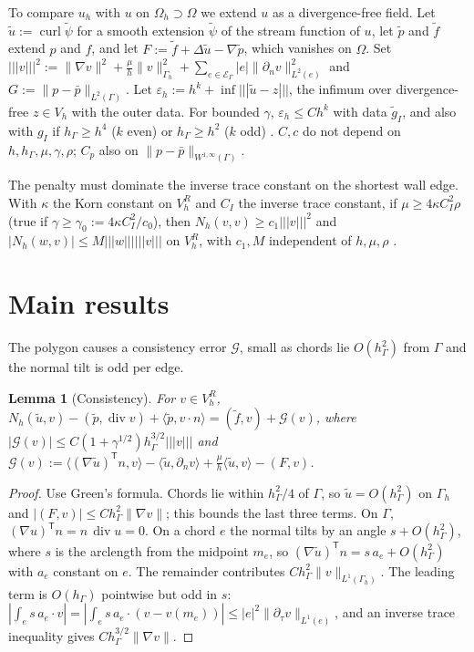 \documentclass[5p,times]{elsarticle}
\newtheorem{lemma}{Lemma}
\theoremstyle{definition}
\newcommand{\hG}{h_\Gamma}
\newcommand{\Gh}{\Gamma_h}
\newcommand{\Oh}{\Omega_h}
\newcommand{\EG}{\mathcal E_\Gamma}
\newcommand{\Vh}{V_h}
\newcommand{\VR}{V_h^R}
\newcommand{\gI}{g_I}
\newcommand{\dn}{\partial_n}
\newcommand{\ut}{\tilde u}
\newcommand{\pt}{\tilde p}
\newcommand{\ft}{\tilde f}
\newcommand{\pbar}{\bar p}
\newcommand{\ip}[2]{\langle #1,#2\rangle}
\newcommand{\tnorm}[1]{|\!|\!|#1|\!|\!|}
\newcommand{\norm}[1]{\lVert #1\rVert}
\newcommand{\eps}{\varepsilon_h}
\newcommand{\Gc}{\mathcal G}
\newcommand{\curl}{\operatorname{curl}}
\renewcommand{\div}{\operatorname{div}}
\newcommand{\ext}[1]{\cite[#1]{PadhiExt}}
\begin{document}
To compare $u_h$ with $u$ on $\Oh\supset\Omega$ we extend $u$ as a divergence-free field. Let $\ut:=\curl\tilde\psi$ for a smooth extension $\tilde\psi$ of the stream function of $u$, let $\pt$ and $\ft$ extend $p$ and $f$, and let $F:=\ft+\Delta\ut-\nabla\pt$, which vanishes on $\Omega$. Set
$\tnorm v^2:=\norm{\nabla v}^2+\frac\mu h\norm v^2_{\Gh}+\sum_{e\in\EG}|e|\norm{\dn v}^2_{L^2(e)}$ and $G:=\norm{p-\pbar}_{L^2(\Gamma)}$.
Let $\eps:=h^k+\inf\tnorm{\ut-z}$, the infimum over divergence-free $z\in\Vh$ with the outer data. For bounded $\gamma$, $\eps\le Ch^k$ with data $\tilde g_I$, and also with $\gI$ if $\hG\ge h^4$ ($k$ even) or $\hG\ge h^2$ ($k$ odd) \ext{Lemmas~4.6, 7.32}. $C,c$ do not depend on $h,\hG,\mu,\gamma,\rho$; $C_p$ also on $\norm{p-\pbar}_{W^{1,\infty}(\Gamma)}$.

The penalty must dominate the inverse trace constant on the shortest wall edge. With $\kappa$ the Korn constant on $\VR$ and $C_I$ the inverse trace constant, if $\mu\ge4\kappa C_I^2\rho$ (true if $\gamma\ge\gamma_0:=4\kappa C_I^2/c_0$), then $N_h(v,v)\ge c_1\tnorm v^2$ and $|N_h(w,v)|\le M\tnorm w\tnorm v$ on $\VR$, with $c_1,M$ independent of $h,\mu,\rho$ \ext{Lemma~4.2}.

\section{Main results}\label{sec:results}

The polygon causes a consistency error $\Gc$, small as chords lie $O(\hG^2)$ from $\Gamma$ and the normal tilt is odd per edge.

\begin{lemma}[Consistency]\label{lem:consist}
For $v\in\VR$, $N_h(\ut,v)-(\pt,\div v)+\ip{\pt}{v\cdot n}=(\ft,v)+\Gc(v)$, where $|\Gc(v)|\le C(1+\gamma^{1/2})\hG^{3/2}\tnorm v$ and
$\Gc(v):=\ip{(\nabla\ut)^{\mathsf T}n}{v}-\ip{\ut}{\dn v}+\frac\mu h\ip{\ut}{v}-(F,v)$.
\end{lemma}

\begin{proof}
Use Green's formula. Chords lie within $\hG^2/4$ of $\Gamma$, so $\ut=O(\hG^2)$ on $\Gh$ and $|(F,v)|\le C\hG^2\norm{\nabla v}$; this bounds the last three terms. On $\Gamma$, $(\nabla u)^{\mathsf T}n=n\,\div u=0$. On a chord $e$ the normal tilts by an angle $s+O(\hG^2)$, where $s$ is the arclength from the midpoint $m_e$, so $(\nabla\ut)^{\mathsf T}n=s\,a_e+O(\hG^2)$ with $a_e$ constant on $e$. The remainder contributes $C\hG^2\norm v_{L^1(\Gh)}$. The leading term is $O(\hG)$ pointwise but odd in $s$: $|\int_es\,a_e\cdot v|=|\int_es\,a_e\cdot(v-v(m_e))|\le|e|^2\norm{\partial_\tau v}_{L^1(e)}$, and an inverse trace inequality gives $C\hG^{3/2}\norm{\nabla v}$.
\end{proof}
\end{document}
